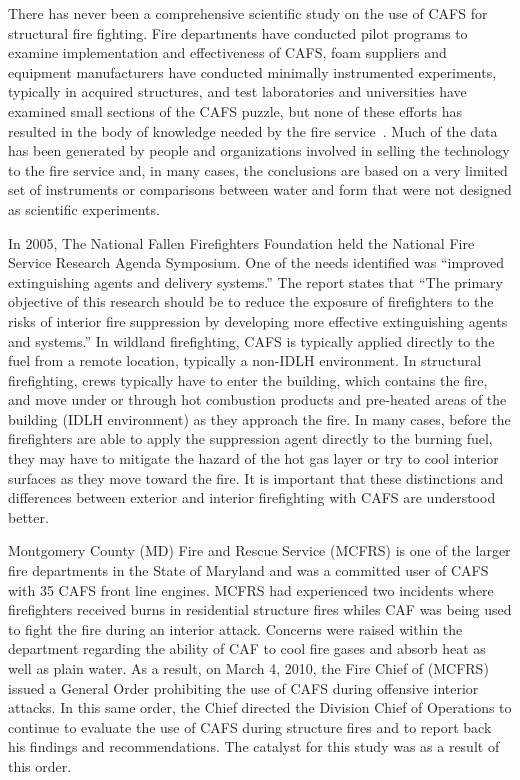 \documentclass[12pt,oneside]{book}
\begin{document}
There has never been a comprehensive scientific study on the use of CAFS for structural fire fighting.  Fire departments have conducted pilot programs to examine implementation and effectiveness of CAFS, foam suppliers and equipment manufacturers have conducted minimally instrumented experiments, typically in acquired structures, and test laboratories and universities have examined small sections of the CAFS puzzle, but none of these efforts has resulted in the body of knowledge needed by the fire service~\cite{Madrzykowski:3,USFA:CAFS,Colletti:1,Boyd:1,Tafreshi:1,Madrzykowski:4,Colletti:2,Tafreshi:2,Lorh:2002,Colletti:3,Kim:2012}. Much of the data has been generated by people and organizations involved in selling the technology to the fire service and, in many cases, the conclusions are based on a very limited set of instruments or comparisons between water and form that were not designed as scientific experiments.

In 2005, The National Fallen Firefighters Foundation held the National Fire Service Research Agenda Symposium.  One of the needs identified was ``improved extinguishing agents and delivery systems.'' The report states that ``The primary objective of this research should be to reduce the exposure of firefighters to the risks of interior fire suppression by developing more effective extinguishing agents and systems.'' In wildland firefighting, CAFS is typically applied directly to the fuel from a remote location, typically a non-IDLH environment. In structural firefighting, crews typically  have to enter the building, which contains the fire, and move under or through hot combustion products and pre-heated areas of the building (IDLH environment) as they approach the fire. In many cases, before the firefighters are able to apply the suppression agent directly to the burning fuel, they may have to mitigate the hazard of the hot gas layer or try to cool interior surfaces as they move toward the fire. It is important that these distinctions and differences between exterior and interior firefighting with CAFS are understood better.

Montgomery County (MD) Fire and Rescue Service (MCFRS) is one of the larger fire departments in the State of Maryland and was a committed user of CAFS with 35 CAFS front line engines. MCFRS had experienced two incidents where firefighters received burns in residential structure fires whiles CAF was being used to fight the fire during an interior attack. Concerns were raised within the department regarding the ability of CAF to cool fire gases and absorb heat as well as plain water. As a result, on March 4, 2010, the Fire Chief of (MCFRS) issued a General Order prohibiting the use of CAFS during offensive interior attacks. In this same order, the Chief directed the Division Chief of Operations to continue to evaluate the use of CAFS during structure fires and to report back his findings and recommendations. The catalyst for this study was as a result of this order.
\end{document}
